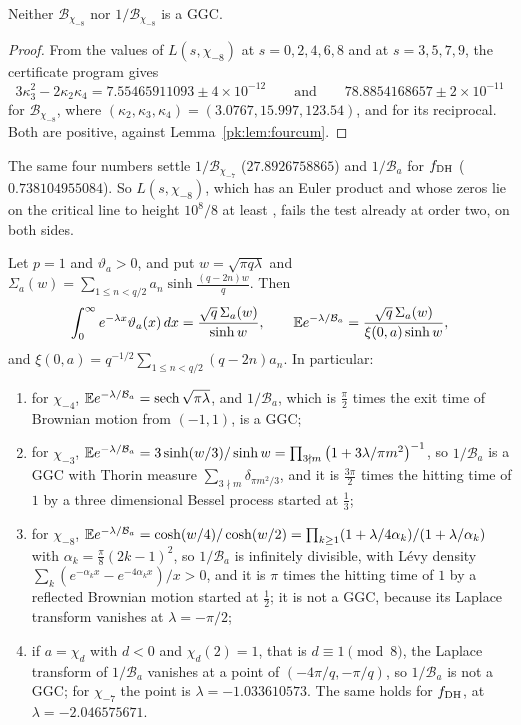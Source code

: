 \begin{proposition}\label{pk:prop:chi8}
Neither $\mathcal B_{\chi_{-8}}$ nor $1/\mathcal B_{\chi_{-8}}$ is a GGC.
\end{proposition}

\begin{proof}
From the values of $L(s,\chi_{-8})$ at $s=0,2,4,6,8$ and at $s=3,5,7,9$, the certificate program gives
\[
3\kappa_3^2-2\kappa_2\kappa_4=7.55465911093\pm4\times10^{-12}\qquad\text{and}\qquad78.8854168657\pm2\times10^{-11}
\]
for $\mathcal B_{\chi_{-8}}$, where $(\kappa_2,\kappa_3,\kappa_4)=(3.0767,15.997,123.54)$, and for its reciprocal. Both are positive, against Lemma~\ref{pk:lem:fourcum}.
\end{proof}

The same four numbers settle $1/\mathcal B_{\chi_{-7}}$ ($27.8926758865$) and $1/\mathcal B_a$ for $f_{\rm DH}$ ($0.738104955084$). So $L(s,\chi_{-8})$, which has an Euler product and whose zeros lie on the critical line to height $10^8/8$ at least \cite{Platt16}, fails the test already at order two, on both sides.

\begin{proposition}\label{pk:prop:reflected}
Let $p=1$ and $\vartheta_a>0$, and put $w=\sqrt{\pi q\lambda}$ and $\Sigma_a(w)=\sum_{1\le n<q/2}a_n\sinh\frac{(q-2n)w}q$. Then
\begin{equation}\label{pk:eq:refl}
\int_0^\infty e^{-\lambda x}\vartheta_a(x)\,dx=\frac{\sqrt q\,\Sigma_a(w)}{\sinh w},\qquad\mathbb{E} e^{-\lambda/\mathcal B_a}=\frac{\sqrt q\,\Sigma_a(w)}{\xi(0,a)\sinh w},
\end{equation}
and $\xi(0,a)=q^{-1/2}\sum_{1\le n<q/2}(q-2n)a_n$. In particular:
\begin{enumerate}
\item[(i)] for $\chi_{-4}$, $\mathbb{E} e^{-\lambda/\mathcal B_a}=\operatorname{sech}\sqrt{\pi\lambda}$, and $1/\mathcal B_a$, which is $\frac\pi2$ times the exit time of Brownian motion from $(-1,1)$, is a GGC;
\item[(ii)] for $\chi_{-3}$, $\mathbb{E} e^{-\lambda/\mathcal B_a}=3\sinh(w/3)/\sinh w=\prod_{3\nmid m}\big(1+3\lambda/\pi m^2\big)^{-1}$, so $1/\mathcal B_a$ is a GGC with Thorin measure $\sum_{3\nmid m}\delta_{\pi m^2/3}$, and it is $\frac{3\pi}2$ times the hitting time of $1$ by a three dimensional Bessel process started at $\frac13$;
\item[(iii)] for $\chi_{-8}$, $\mathbb{E} e^{-\lambda/\mathcal B_a}=\cosh(w/4)/\cosh(w/2)=\prod_{k\ge1}(1+\lambda/4\alpha_k)/(1+\lambda/\alpha_k)$ with $\alpha_k=\frac\pi8(2k-1)^2$, so $1/\mathcal B_a$ is infinitely divisible, with L\'evy density $\sum_k(e^{-\alpha_kx}-e^{-4\alpha_kx})/x>0$, and it is $\pi$ times the hitting time of $1$ by a reflected Brownian motion started at $\frac12$; it is not a GGC, because its Laplace transform vanishes at $\lambda=-\pi/2$;
\item[(iv)] if $a=\chi_d$ with $d<0$ and $\chi_d(2)=1$, that is $d\equiv1\pmod 8$, the Laplace transform of $1/\mathcal B_a$ vanishes at a point of $(-4\pi/q,-\pi/q)$, so $1/\mathcal B_a$ is not a GGC; for $\chi_{-7}$ the point is $\lambda=-1.033610573$. The same holds for $f_{\rm DH}$, at $\lambda=-2.046575671$.
\end{enumerate}
\end{proposition}

